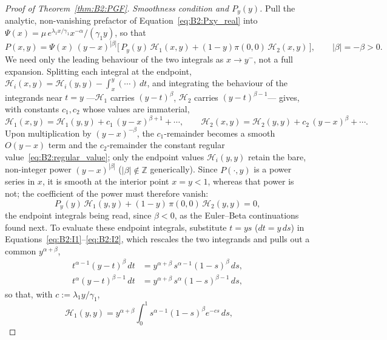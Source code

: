\begin{proof}[Proof of Theorem~\ref{thm:B2:PGF}]
\smallskip\noindent\textit{Smoothness condition and $P_y(y)$.}
Pull the analytic, non-vanishing prefactor of Equation~\eqref{eq:B2:Pxy_real} into
$\Psi(x)=\mu\,e^{\lambda_1 x/\gamma_1}x^{-\alpha}/(\gamma_1 y)$, so that
\begin{equation*}
    P(x,y)=\Psi(x)\,(y-x)^{|\beta|}
        \bigl[\,P_y(y)\,\mathcal{H}_1(x,y)+(1-y)\pi(0,0)\,\mathcal{H}_2(x,y)\,\bigr],
    \qquad |\beta|=-\beta>0 .
\end{equation*}
We need only the leading behaviour of the two integrals as $x\to y^{-}$, not a full expansion.
Splitting each integral at the endpoint, $\mathcal{H}_i(x,y)=\mathcal{H}_i(y,y)-\int_x^y(\cdots)\,dt$,
and integrating the behaviour of the integrands near $t=y$ ---$\mathcal{H}_1$ carries
$(y-t)^{\beta}$, $\mathcal{H}_2$ carries $(y-t)^{\beta-1}$--- gives, with constants $c_1,c_2$
whose values are immaterial,
\begin{equation*}
    \mathcal{H}_1(x,y)=\mathcal{H}_1(y,y)+c_1\,(y-x)^{\beta+1}+\cdots, \qquad
    \mathcal{H}_2(x,y)=\mathcal{H}_2(y,y)+c_2\,(y-x)^{\beta}+\cdots .
\end{equation*}
Upon multiplication by $(y-x)^{-\beta}$, the $c_1$-remainder becomes a smooth $O(y-x)$ term
and the $c_2$-remainder the constant regular value~\eqref{eq:B2:regular_value}; only the
endpoint values $\mathcal{H}_i(y,y)$ retain the bare, non-integer power $(y-x)^{|\beta|}$
($|\beta|\notin\mathbb{Z}$ generically). Since $P(\cdot,y)$ is a power series in $x$, it is
smooth at the interior point $x=y<1$, whereas that power is not; the coefficient of the power
must therefore vanish:
\begin{equation}
    P_y(y)\,\mathcal{H}_1(y,y) + (1-y)\,\pi(0,0)\,\mathcal{H}_2(y,y) = 0 ,
    \label{eq:B2:nobranch}
\end{equation}
the endpoint integrals being read, since $\beta<0$, as the Euler--Beta continuations found next.
To evaluate these endpoint integrals, substitute $t=ys$ ($dt=y\,ds$)
in Equations~\eqref{eq:B2:I1}--\eqref{eq:B2:I2}, which rescales the two integrands and pulls out a common
$y^{\alpha+\beta}$,
\begin{align*}
    t^{\alpha-1}(y-t)^{\beta}\,dt &= y^{\alpha+\beta}\,s^{\alpha-1}(1-s)^{\beta}\,ds, \\
    t^{\alpha}(y-t)^{\beta-1}\,dt &= y^{\alpha+\beta}\,s^{\alpha}(1-s)^{\beta-1}\,ds,
\end{align*}
so that, with $c:=\lambda_1 y/\gamma_1$,
\[
    \mathcal{H}_1(y,y)=y^{\alpha+\beta}\!\int_0^1\! s^{\alpha-1}(1-s)^{\beta}e^{-cs}\,ds,
    \qquad
\]
\end{proof}
